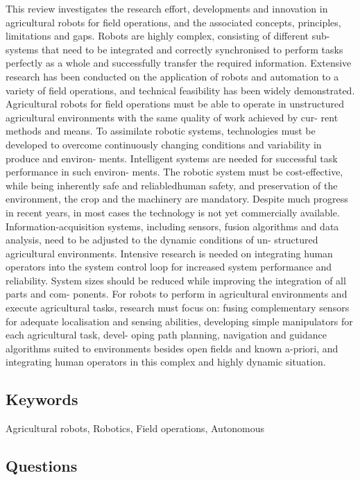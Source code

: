 \documentclass{article}
\begin{document}
This review investigates the research effort, developments and innovation in agricultural
robots for field operations, and the associated concepts, principles, limitations and gaps.
Robots are highly complex, consisting of different sub-systems that need to be integrated
and correctly synchronised to perform tasks perfectly as a whole and successfully transfer
the required information. Extensive research has been conducted on the application of
robots and automation to a variety of field operations, and technical feasibility has been
widely demonstrated. Agricultural robots for field operations must be able to operate in
unstructured agricultural environments with the same quality of work achieved by cur-
rent methods and means. To assimilate robotic systems, technologies must be developed
to overcome continuously changing conditions and variability in produce and environ-
ments. Intelligent systems are needed for successful task performance in such environ-
ments. The robotic system must be cost-effective, while being inherently safe and
reliabledhuman safety, and preservation of the environment, the crop and the machinery
are mandatory. Despite much progress in recent years, in most cases the technology is not
yet commercially available. Information-acquisition systems, including sensors, fusion
algorithms and data analysis, need to be adjusted to the dynamic conditions of un-
structured agricultural environments. Intensive research is needed on integrating human
operators into the system control loop for increased system performance and reliability.
System sizes should be reduced while improving the integration of all parts and com-
ponents. For robots to perform in agricultural environments and execute agricultural
tasks, research must focus on: fusing complementary sensors for adequate localisation
and sensing abilities, developing simple manipulators for each agricultural task, devel-
oping path planning, navigation and guidance algorithms suited to environments besides
open fields and known a-priori, and integrating human operators in this complex and
highly dynamic situation.


\subsection*{Keywords}
Agricultural robots, Robotics, Field operations, Autonomous


\subsection*{Questions}
\end{document}
